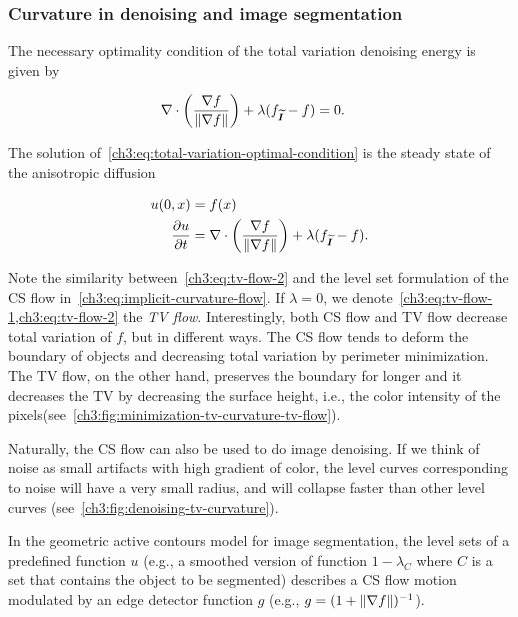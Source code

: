 \subsubsection{Curvature in denoising and image segmentation}

The necessary optimality condition of the total variation denoising energy is given by

\begin{align}
	\nabla \cdot \left( \frac{\nabla f}{\lVert\nabla f\rVert} \right) + \lambda( f_{\widetilde{\bm{I}}} - f ) &= 0.
	\label{ch3:eq:total-variation-optimal-condition}
\end{align}

The solution of~\cref{ch3:eq:total-variation-optimal-condition} is the steady state of the  anisotropic diffusion

\begin{align}
	u(0,x) &= f(x) 	\label{ch3:eq:tv-flow-1} \\
	\frac{\partial u}{\partial t} &= \nabla \cdot \left( \frac{\nabla f}{\lVert\nabla f\rVert} \right) + \lambda( f_{\widetilde{\bm{I}}} - f ). \label{ch3:eq:tv-flow-2}
\end{align}

Note the similarity between~\cref{ch3:eq:tv-flow-2} and the level set formulation of the CS flow in~\cref{ch3:eq:implicit-curvature-flow}. If $\lambda=0$, we denote~\cref{ch3:eq:tv-flow-1,ch3:eq:tv-flow-2} the \emph{TV flow}\cite{bellettini02total}. Interestingly, both CS flow and TV flow decrease total variation of $f$, but in different ways. The CS flow tends to deform the boundary of objects and decreasing total variation by perimeter minimization. The TV flow, on the other hand, preserves the boundary for longer and it decreases the TV by decreasing the surface height, i.e., the color intensity of the pixels(see~\cref{ch3:fig:minimization-tv-curvature-tv-flow}).

Naturally, the CS flow can also be used to do image denoising. If we think of noise as small artifacts with high gradient of color, the level curves corresponding to noise will have a very small radius, and will collapse faster than other level curves (see~\cref{ch3:fig:denoising-tv-curvature}). 


In the geometric active contours model for image segmentation, the level sets of a predefined function $u$ (e.g., a smoothed version of function $1-\lambda_C$ where $C$ is a set that contains the object to be segmented) describes a CS flow motion modulated by an edge detector function $g$ (e.g., $g=(1+\lVert \nabla f \rVert)^{-1}$).

